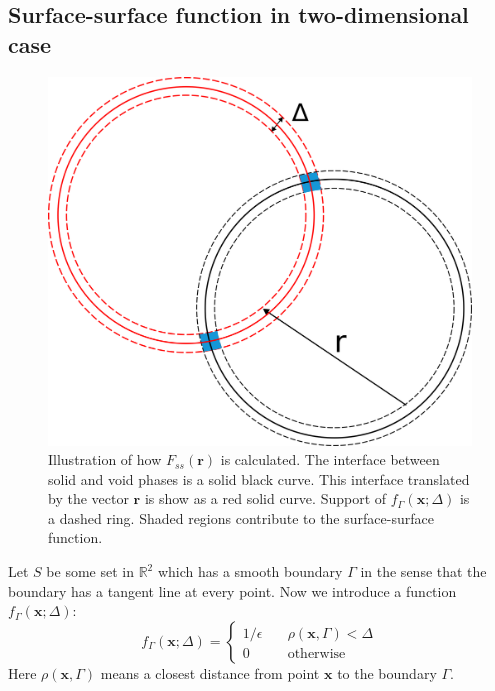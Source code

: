 \documentclass[reprint,amsmath,amssymb,aps,pre,showkeys,showpacs]{revtex4-1}
\begin{document}
\subsection{Surface-surface function in two-dimensional case}
\label{sec:fss-2d}
\begin{figure}
  \centering
  \includegraphics[width=0.8\linewidth]{images/Fss.png}
  \caption[]{Illustration of how $F_{ss}(\bm{r})$ is calculated. The interface
    between solid and void phases is a solid black curve. This interface
    translated by the vector $\bm{r}$ is show as a red solid curve. Support of
    $f_\Gamma(\bm{x}; \Delta)$ is a dashed ring. Shaded regions contribute to
    the surface-surface function.}
  \label{fig:Fss-explained}
\end{figure}
Let $S$ be some set in $\mathbb{R}^2$ which has a smooth boundary $\Gamma$ in
the sense that the boundary has a tangent line at every point. Now we introduce
a function $f_\Gamma(\bm{x}; \Delta)$:
\begin{equation*}
  f_\Gamma(\bm{x}; \Delta) = \left\{
  \begin{array}{ll}
    1/\epsilon & \quad \rho(\bm{x}, \Gamma) < \Delta \\
    0 & \quad \text{otherwise}
  \end{array}
  \right.
\end{equation*}
Here $\rho(\bm{x}, \Gamma)$ means a closest distance from point $\bm{x}$ to the
boundary $\Gamma$.
\end{document}
